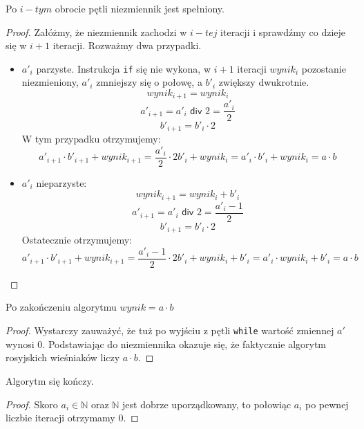 \begin{lemma}
Po $i-tym$ obrocie pętli niezmiennik jest spełniony.
\end{lemma}
\begin{proof}
Załóżmy, że niezmiennik zachodzi w $i-tej$ iteracji i sprawdźmy co dzieje się w $i+1$ iteracji.
Rozważmy dwa przypadki.


\begin{itemize}
    \item $a'_i$ parzyste. Instrukcja \texttt{if} się nie wykona, w $i+1$ iteracji $wynik_i$ pozostanie niezmieniony, $a'_i$ zmniejszy się o połowę, a $b'_i$ zwiększy dwukrotnie. 
    \[
      wynik_{i+1} = wynik_i
    \]
    \[
      a'_{i+1} = a'_i \textsf{ div } 2 = \frac{a'_i}{2}
    \]
    \[
      b'_{i+1} = b'_i \cdot 2
    \]
    W tym przypadku otrzymujemy:
    \[
      a'_{i+1} \cdot b'_{i+1} + wynik_{i+1} = \frac{a'_i}{2} \cdot 2 b'_i + wynik_i = a'_i \cdot b'_i + wynik_i = a \cdot b
    \]

    \item $a'_i$ nieparzyste:
    \[
      wynik_{i+1} = wynik_i + b'_i
    \]
    \[
      a'_{i+1} = a'_i \textsf{ div } 2 = \frac{a'_i-1}{2}
    \]
    \[
      b'_{i+1} = b'_i \cdot 2
    \]
    Ostatecznie otrzymujemy:
    \[
      a'_{i+1} \cdot b'_{i+1} + wynik_{i+1} = \frac{a'_i-1}{2} \cdot 2 b'_i + wynik_i +b'_i = a'_i \cdot wynik_i + b'_i= a \cdot b
    \]

\end{itemize}

\end{proof}

\begin{lemma}
Po zakończeniu algorytmu $wynik = a \cdot b$

\end{lemma}
\begin{proof}
Wystarczy zauważyć, że tuż po wyjściu z pętli \texttt{while} wartość zmiennej $a'$ wynosi $0$.
Podstawiając do niezmiennika okazuje się, że faktycznie algorytm rosyjskich wieśniaków liczy $a \cdot b$.
\end{proof}

\begin{lemma}
Algorytm się kończy.
\end{lemma}
\begin{proof}
Skoro $a_i \in \mathbb{N} $ oraz $\mathbb{N}$ jest dobrze uporządkowany, to połowiąc $a_i$ po pewnej liczbie iteracji otrzymamy 0.
\end{proof}

